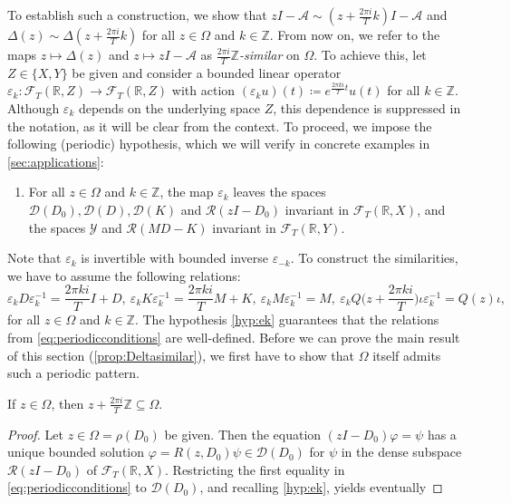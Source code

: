 \documentclass[english]{myarticle}
\begin{document}
\begin{sloppypar}
To establish such a construction, we show that $zI - \mathcal{A} \sim (z + \frac{2 \pi i}{T}  k)I - \mathcal{A}$ and $\Delta(z) \sim \Delta(z+\frac{2 \pi i}{T} k)$ for all $z \in \Omega$ and $k \in \mathbb{Z}$. From now on, we refer to the maps 
$z \mapsto \Delta(z)$ and $z \mapsto zI - \mathcal{A}$ as 
$\frac{2\pi i}{T}\mathbb{Z}$\emph{-similar} on $\Omega$.
To achieve this, let $Z \in \{X,Y\}$ be given and consider a bounded linear operator $\varepsilon_k : \mathcal{F}_T(\mathbb{R},Z) \to \mathcal{F}_T(\mathbb{R},Z)$ with action $(\varepsilon_k u)(t) \coloneqq e^{\frac{2 \pi k i}{T}t}u(t)$ for all $k \in \mathbb{Z}$. Although $\varepsilon_k$ depends on the underlying space $Z$, this dependence is suppressed in the notation, as it will be clear from the context. To proceed, we impose the following (periodic) hypothesis, which we will verify in concrete examples in \cref{sec:applications}:
\begin{enumerate}[label=({PH}{{\arabic*}})]
\setcounter{enumi}{0}
\item \label{hyp:ek} For all $z \in \Omega$ and $k \in \mathbb{Z}$, the map $\varepsilon_k$ leaves the spaces $\mathcal{D}(D_0), \mathcal{D}(D),\mathcal{D}(K)$ and $\mathcal{R}(zI-D_0)$ invariant in $\mathcal{F}_T(\mathbb{R},X)$, and the spaces $\mathcal{Y}$ and $\mathcal{R}(MD-K)$ invariant in $\mathcal{F}_T(\mathbb{R},Y)$.
\end{enumerate}
Note that $\varepsilon_k$ is invertible with bounded inverse $\varepsilon_{-k}$. To construct the similarities, we have to assume the following relations:
\begin{equation} \tag{PH2} \label{eq:periodicconditions}
    \varepsilon_k D \varepsilon_k^{-1} = \frac{2 \pi k i}{T} I + D, \ \varepsilon_k K \varepsilon_k^{-1} = \frac{2 \pi k i}{T} M + K, \ \varepsilon_k M \varepsilon_k^{-1} = M, \ \varepsilon_k Q\bigg(z + \frac{2 \pi k i}{T}\bigg) \iota \varepsilon_k^{-1} = Q(z)\iota,
\end{equation}
for all $z \in \Omega$ and $k \in \mathbb{Z}$. The hypothesis \ref{hyp:ek} guarantees that the relations from \eqref{eq:periodicconditions} are well-defined. Before we can prove the main result of this section (\cref{prop:Deltasimilar}), we first have to show that $\Omega$ itself admits such a periodic pattern.
\begin{lemma}
If $z \in \Omega$, then $z + \frac{2\pi i}{T} \mathbb{Z} \subseteq \Omega$.
\end{lemma}
\begin{proof}
Let $z \in \Omega = \rho(D_0)$ be given. Then the equation $(zI-D_0)\varphi = \psi$ has a unique bounded solution $\varphi = R(z,D_0)\psi \in \mathcal{D}(D_0)$ for $\psi$ in the dense subspace $\mathcal{R}(zI-D_0)$ of $\mathcal{F}_T(\mathbb{R},X)$. Restricting the first equality in \eqref{eq:periodicconditions} to $\mathcal{D}(D_0)$, and recalling \ref{hyp:ek}, yields eventually

\end{proof}
\end{sloppypar}
\end{document}
